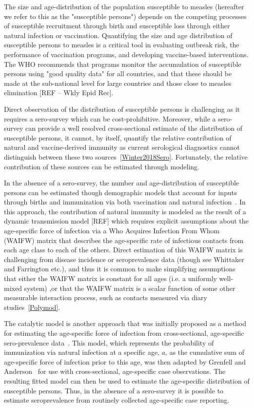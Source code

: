 \documentclass[nofootinbib,aps,pre,twocolumn,superscriptaddress,showkeys,showpacs]{revtex4-1}
\begin{document}
The size and age-distribution of the population susceptible to measles (hereafter we refer to this as the "susceptible persons") depends on the competing processes of susceptible recruitment through birth and susceptible loss through either natural infection or vaccination. 
Quantifying the size and age distribution of susceptible persons to measles is a critical tool in evaluating outbreak risk, the performance of vaccination programs, and developing vaccine-based interventions. The WHO recommends that programs monitor the accumulation of susceptible persons using "good quality data" for all countries, and that these should be made at the sub-national level for large countries and those close to measles elimination [REF -- Wkly Epid Rec].

Direct observation of the distribution of susceptible persons is challenging as it requires a sero-survey which can be cost-prohibitive. 
Moreover, while a sero-survey can provide a well resolved cross-sectional estimate of the distribution of susceptible persons, it cannot, by itself, quantify the relative contribution of natural and vaccine-derived immunity as current serological diagnostics cannot distinguish between these two sources~\ref{Winter2018Sero}. Fortunately, the relative contribution of these sources can be estimated through modeling. 

In the absence of a sero-survey, the number and age-distribution of susceptible persons can be estimated though demographic models that account for inputs through births and immunization via both vaccination and natural infection~\cite{METCALF2017S14,TRENTINI20171089,Winter2018Sero}. In this approach, the contribution of natural immunity is modeled as the result of a dynamic transmission model [REF] which requires explicit assumptions about the age-specific force of infection via a Who Acquires Infection From Whom (WAIFW) matrix that describes the age-specific rate of infectious contacts from each age class to each of the others.  Direct estimation of this WAIFW matrix is challenging from disease incidence or seroprevalence data (though see Whittaker and Farrington etc.), and thus it is common to make simplifying assumptions that either the WAIFW matrix is constant for all ages (i.e. a uniformly well-mixed system) ,or that the WAIFW matrix is a scalar function of some other measurable interaction process, such as contacts measured via diary studies~\ref{Polymod}.

The catalytic model is another approach that was initially proposed as a method for estimating the age-specific force of infection from cross-sectional, age-specific sero-prevalence data~\cite{griffiths_catalytic_1974}. 
This model, which represents the probability of immunization via natural infection at a specific age, $a$, as the cumulative sum of age-specific force of infection prior to this age, was then adapted by Grenfell and Anderson~\cite{Grenfell1985} for use with cross-sectional, age-specific case observations.  
The resulting fitted model can then be used to estimate the age-specific distribution of susceptible persons.
Thus, in the absence of a sero-survey it is possible to estimate seroprevalence from routinely collected age-specific case reporting.
\end{document}
